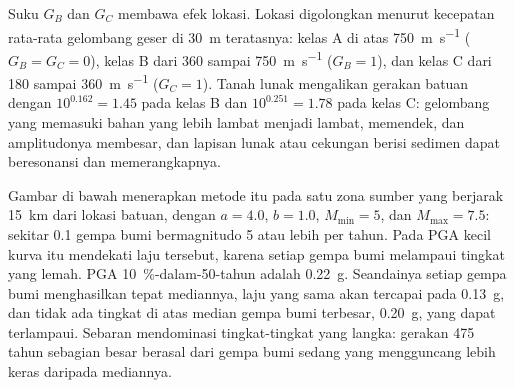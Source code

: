 Suku $G_B$ dan $G_C$ membawa efek lokasi. Lokasi digolongkan menurut kecepatan rata-rata gelombang geser
di \qty{30}{m} teratasnya: kelas A di atas \qty{750}{m.s^{-1}} ($G_B = G_C = 0$), kelas B dari
360 sampai \qty{750}{m.s^{-1}} ($G_B = 1$), dan kelas C dari 180 sampai \qty{360}{m.s^{-1}} ($G_C = 1$). Tanah
lunak mengalikan gerakan batuan dengan $10^{0.162} = 1.45$ pada kelas B dan $10^{0.251} = 1.78$ pada kelas
C: gelombang yang memasuki bahan yang lebih lambat menjadi lambat, memendek, dan amplitudonya membesar, dan lapisan lunak atau
cekungan berisi sedimen dapat beresonansi dan memerangkapnya.

Gambar di bawah menerapkan metode itu pada satu zona sumber yang berjarak \qty{15}{km} dari lokasi batuan, dengan $a
= 4.0$, $b = 1.0$, $M_{\min} = 5$, dan $M_{\max} = 7.5$: sekitar 0.1 gempa bumi bermagnitudo 5 atau
lebih per tahun. Pada PGA kecil kurva itu mendekati laju tersebut, karena setiap gempa bumi melampaui tingkat
yang lemah. PGA \qty{10}{\percent}-dalam-50-tahun adalah \qty{0.22}{g}. Seandainya setiap gempa bumi menghasilkan
tepat mediannya, laju yang sama akan tercapai pada \qty{0.13}{g}, dan tidak ada tingkat di atas median
gempa bumi terbesar, \qty{0.20}{g}, yang dapat terlampaui. Sebaran mendominasi tingkat-tingkat
yang langka: gerakan 475 tahun sebagian besar berasal dari gempa bumi sedang yang mengguncang lebih keras daripada
mediannya.

